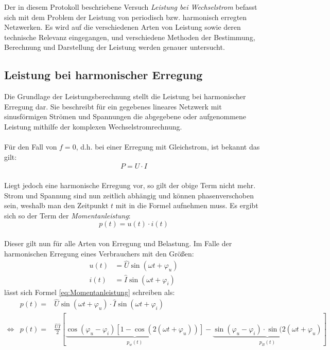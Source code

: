 
Der in diesem Protokoll beschriebene Versuch \textit{Leistung bei Wechselstrom} befasst sich mit dem Problem der Leistung von periodisch bzw. harmonisch erregten Netzwerken. Es wird auf die verschiedenen Arten von Leistung sowie deren technische Relevanz eingegangen, und verschiedene Methoden der Bestimmung, Berechnung und Darstellung der Leistung werden genauer untersucht.

\subsection{Leistung bei harmonischer Erregung}

Die Grundlage der Leistungsberechnung stellt die Leistung bei harmonischer Erregung dar. Sie beschreibt für ein gegebenes lineares Netzwerk mit sinusförmigen Strömen und Spannungen die abgegebene oder aufgenommene Leistung mithilfe der komplexen Wechselstromrechnung.\\
\\
Für den Fall von $f=0$, d.h. bei einer Erregung mit Gleichstrom, ist bekannt das gilt:
\begin{align*}
P=U\cdot I
\end{align*}
\\
Liegt jedoch eine harmonische Erregung vor, so gilt der obige Term nicht mehr. Strom und Spannung sind nun zeitlich abhängig und können phasenverschoben sein, weshalb man den Zeitpunkt $t$ mit in die Formel aufnehmen muss. Es ergibt sich so der Term der \textit{Momentanleistung}:
\begin{equation} \label{eq:Momentanleistung}
p(t)=u(t)\cdot i(t)
\end{equation}
\\
Dieser gilt nun für alle Arten von Erregung und Belastung. Im Falle der harmonischen Erregung eines Verbrauchers mit den Größen:
\begin{align*}
u(t) &= \hat{U}\sin(\omega t + \varphi_u)\\
i(t) &= \hat{I}\sin(\omega t + \varphi_i)
\end{align*}
lässt sich Formel \eqref{eq:Momentanleistung} schreiben als:
\begin{align}
& p(t) =& \hat{U}\sin(\omega t + \varphi_u) \cdot \hat{I}\sin(\omega t + \varphi_i)\nonumber \\
\Leftrightarrow & p(t) =& \frac{\hat{U}\hat{I}}{2}\left[\underbrace{\cos(\varphi_u-\varphi_i)[1-\cos(2(\omega t + \varphi_u))]}_{p_w(t)}-\underbrace{\sin(\varphi_u-\varphi_i)\cdot\sin(2(\omega t + \varphi_u)}_{p_B(t)}\right] \label{eq:MomLeistungSplit}
\end{align}

